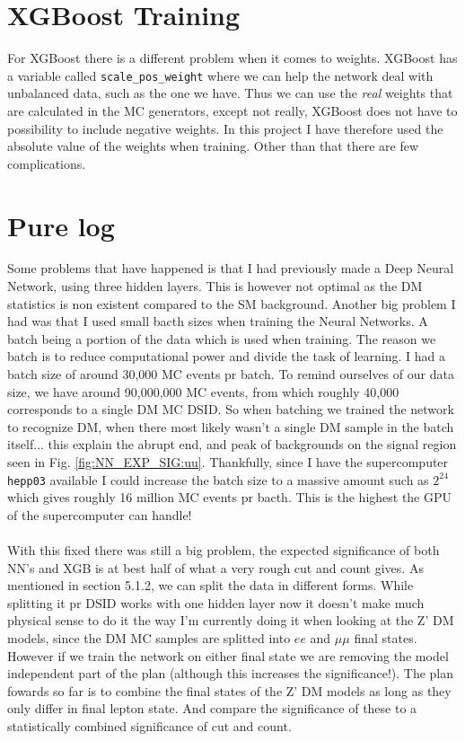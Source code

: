 \documentclass[14pt, a4paper]{book}
\begin{document}
\section{XGBoost Training}
For XGBoost there is a different problem when it comes to weights. XGBoost has a variable called \verb|scale_pos_weight| where we can help the network deal with unbalanced data, such as the one we have. Thus we can use the \textit{real} weights that are calculated in the MC generators, except not really, XGBoost does not have to possibility to include negative weights. In this project I have therefore used the absolute value of the weights when training. Other than that there are few complications. 

\section{Pure log}
Some problems that have happened is that I had previously made a Deep Neural Network, using three hidden layers. This is however not optimal as the DM statistics is non existent compared to the SM background. Another big problem I had was that I used small bacth sizes when training the Neural Networks. A batch being a portion of the data which is used when training. The reason we batch is to reduce computational power and divide the task of learning. I had a batch size of around 30,000 MC events pr batch. To remind ourselves of our data size, we have around 90,000,000 MC events, from which roughly 40,000 corresponds to a single DM MC DSID. So when batching we trained the network to recognize DM, when there most likely wasn't a single DM sample in the batch itself... this explain the abrupt end, and peak of backgrounds on the signal region seen in Fig. \ref{fig:NN_EXP_SIG:uu}. Thankfully, since I have the supercomputer \verb|hepp03| available I could increase the batch size to a massive amount such as $2^24$ which gives roughly 16 million MC events pr bacth. This is the highest the GPU of the supercomputer can handle!\\
\\With this fixed there was still a big problem, the expected significance of both NN's and XGB is at best half of what a very rough cut and count gives. As mentioned in section 5.1.2, we can split the data in different forms. While splitting it pr DSID works with one hidden layer now it doesn't make much physical sense to do it the way I'm currently doing it when looking at the Z' DM models, since the DM MC samples are splitted into $ee$ and $\mu\mu$ final states. However if we train the network on either final state we are removing the model independent part of the plan (although this increases the significance!). The plan fowards so far is to combine the final states of the Z' DM models as long as they only differ in final lepton state. And compare the significance of these to a statistically combined significance of cut and count.\\
\end{document}
